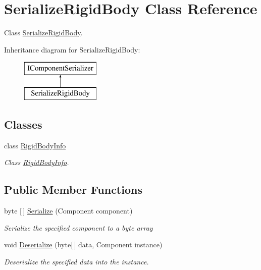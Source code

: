 \hypertarget{class_serialize_rigid_body}{}\section{Serialize\+Rigid\+Body Class Reference}
\label{class_serialize_rigid_body}


Class \hyperlink{class_serialize_rigid_body}{Serialize\+Rigid\+Body}.  


Inheritance diagram for Serialize\+Rigid\+Body\+:\begin{figure}[H]
\begin{center}
\leavevmode
\includegraphics[height=2.000000cm]{class_serialize_rigid_body}
\end{center}
\end{figure}
\subsection*{Classes}
\begin{DoxyCompactItemize}
\item 
class \hyperlink{class_serialize_rigid_body_1_1_rigid_body_info}{Rigid\+Body\+Info}
\begin{DoxyCompactList}\small\item\em Class \hyperlink{class_serialize_rigid_body_1_1_rigid_body_info}{Rigid\+Body\+Info}. \end{DoxyCompactList}\end{DoxyCompactItemize}
\subsection*{Public Member Functions}
\begin{DoxyCompactItemize}
\item 
byte \mbox{[}$\,$\mbox{]} \hyperlink{class_serialize_rigid_body_a5b70b8af5b0b775bc961eb553a36b438}{Serialize} (Component component)
\begin{DoxyCompactList}\small\item\em Serialize the specified component to a byte array \end{DoxyCompactList}\item 
void \hyperlink{class_serialize_rigid_body_a5d6e7d0282184b45b23d579b872e89a2}{Deserialize} (byte\mbox{[}$\,$\mbox{]} data, Component instance)
\begin{DoxyCompactList}\small\item\em Deserialize the specified data into the instance. \end{DoxyCompactList}\end{DoxyCompactItemize}


